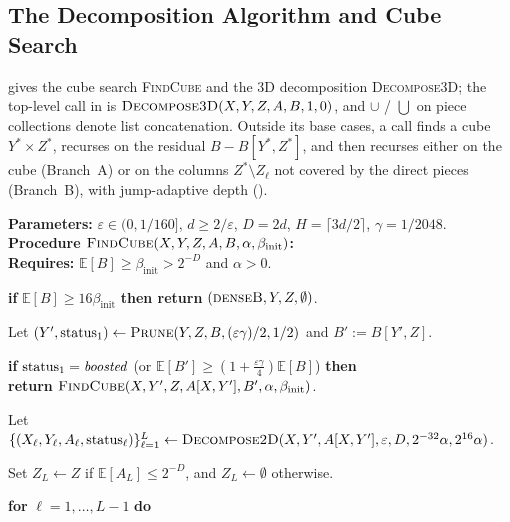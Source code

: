 \documentclass[11pt]{article}
\theoremstyle{definition}
\renewcommand{\label}[1]{}%
\newcommand{\E}{\mathbb{E}}
\newcommand{\dens}[1]{\E[#1]}
\newcommand{\Prune}{\textnormal{\textsc{Prune}}}
\newcommand{\DecomposeTwoD}{\textnormal{\textsc{Decompose2D}}}
\newcommand{\FindCube}{\textnormal{\textsc{FindCube}}}
\newcommand{\DecomposeThreeD}{\textnormal{\textsc{Decompose3D}}}
\newcommand{\tagdenseB}{\textnormal{\textsc{denseB}}}
\begin{document}
\subsection{The Decomposition Algorithm and Cube Search}
\label{sec:3d-alg}

 gives the cube search \FindCube{} and the 3D decomposition \DecomposeThreeD{}; the top-level call in  is $\DecomposeThreeD(X, Y, Z, A, B, 1, 0)$, and $\cup$ / $\bigcup$ on piece collections denote list concatenation. Outside its base cases, a call finds a cube $Y^* \times Z^*$, recurses on the residual $B - B[Y^*, Z^*]$, and then recurses either on the cube (Branch~A) or on the columns $Z^* \setminus Z_\ell$ not covered by the direct pieces (Branch~B), with jump-adaptive depth ().

\begin{algorithm}[!htbp]
\caption{$\FindCube(X, Y, Z, A, B, \alpha, \beta_{\text{init}})$ and $\DecomposeThreeD(X, Y, Z, A, B, \alpha, h)$}\label{alg:3d}
\textbf{Parameters:} $\varepsilon \in (0, 1/160]$, $d \ge 2/\varepsilon$, $D = 2d$, $H = \lceil 3d/2 \rceil$, $\gamma = 1/2048$.\\[2pt]
\textbf{Procedure $\FindCube(X, Y, Z, A, B, \alpha, \beta_{\text{init}})$:}\\
\textbf{Requires:} $\dens{B} \ge \beta_{\text{init}} > 2^{-D}$ and $\alpha > 0$.
\begin{algsteps}
    \item \textbf{if} $\dens{B} \ge 16\beta_{\text{init}}$ \textbf{then return} $(\tagdenseB, Y, Z, \emptyset)$.\label{line:cube-cap}
    \item Let $(Y', \text{status}_1) \gets \Prune(Y, Z, B, (\varepsilon\gamma)/2, 1/2)$ and $B' := B[Y', Z]$.\label{line:cube-prune1}
    \item \textbf{if} $\text{status}_1 = \text{\emph{boosted}}$ (or $\dens{B'} \ge (1 + \frac{\varepsilon\gamma}{4})\dens{B}$) \textbf{then}\\
    \quad \textbf{return} $\FindCube(X, Y', Z, A[X, Y'], B', \alpha, \beta_{\text{init}})$.\label{line:cube-rec1}
    \item Let $\{(X_\ell, Y_\ell, A_\ell, \text{status}_\ell)\}_{\ell=1}^L \gets \DecomposeTwoD(X, Y', A[X, Y'], \varepsilon, D, 2^{-32}\alpha, 2^{16}\alpha)$.\label{line:cube-dec2d}
    \item Set $Z_L \gets Z$ if $\dens{A_L} \le 2^{-D}$, and $Z_L \gets \emptyset$ otherwise.\label{line:cube-zl}
    \item \textbf{for} $\ell = 1, \dots, L - 1$ \textbf{do}\label{line:cube-loop}

\end{algsteps}
\end{algorithm}
\end{document}
